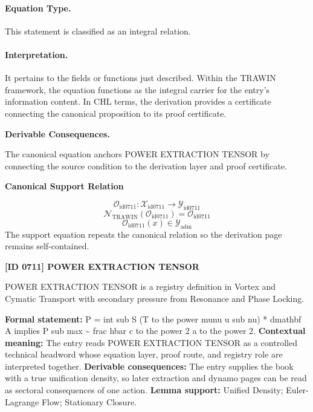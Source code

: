 \paragraph{Equation Type.}
This statement is classified as an integral relation.

\paragraph{Interpretation.}
It pertains to the fields or functions just described. Within the TRAWIN framework, the equation functions as the integral carrier for the entry’s information content. In CHL terms, the derivation provides a certificate connecting the canonical proposition to its proof certificate.

\par\vspace{0.35em}
\noindent\textbf{Derivable Consequences.}\quad
\begingroup
\footnotesize
\raggedright
The canonical equation anchors POWER EXTRACTION TENSOR by connecting the source condition to the derivation layer and proof certificate.
\par\endgroup

\noindent\textbf{Canonical Support Relation}\par
\[
\mathcal{O}_{\mathrm{id0711}}:\mathcal{X}_{\mathrm{id0711}}\longrightarrow\mathcal{Y}_{\mathrm{id0711}}
\]
\[
\mathcal{N}_{\mathrm{TRAWIN}}(\mathcal{O}_{\mathrm{id0711}})=\mathcal{O}_{\mathrm{id0711}}
\]
\[
\mathcal{O}_{\mathrm{id0711}}(x)\in\mathcal{Y}_{\mathrm{adm}}
\]
\noindent The support equation repeats the canonical relation so the derivation page remains self-contained.\par

\clearpage
\noindent\textbf{[ID 0711] POWER EXTRACTION TENSOR}\par
\vspace{0.35em}
\begingroup\small
{}
POWER EXTRACTION TENSOR is a registry definition in Vortex and Cymatic Transport with secondary pressure from Resonance and Phase Locking.

\begingroup\footnotesize\setlength{\emergencystretch}{3em}\sloppy
\textbf{Formal statement:} P = int sub S (T to the power munu u sub nu) * dmathbf A implies P sub max \textasciitilde{} frac hbar c to the power 2 a to the power 2. \textbf{Contextual meaning:} The entry reads POWER EXTRACTION TENSOR as a controlled technical headword whose equation layer, proof route, and registry role are interpreted together. \textbf{Derivable consequences:} The entry supplies the book with a true unification density, so later extraction and dynamo pages can be read as sectoral consequences of one action. \textbf{Lemma support:} Unified Density; Euler-Lagrange Flow; Stationary Closure.\par
\endgroup

